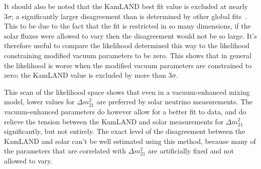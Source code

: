\begin{appendices}
It should also be noted that the KamLAND best fit value is excluded at nearly
$3\sigma$;
a significantly larger disagreement than is determined by other global fits~\cite{nu_fit}.
This to be due to the fact that the fit is restricted in so
many dimensions, if the solar fluxes were allowed to vary then the disagreement
would not be so large.
It's therefore useful to compare the likelihood determined this way to the
likelihood constraining modified vacuum parameters to be zero.
This shows that in general the likelihood is worse when the modified
vacuum parameters are constrained to zero;
the KamLAND value is excluded by more than $3\sigma$.

This scan of the likelihood space shows that even in a vacuum-enhanced mixing
model, lower values for $\Delta m^{2}_{21}$ are preferred by solar neutrino
measurements.
The vacuum-enhanced parameters do however allow for a better fit to data,
and do relieve the tension between the KamLAND and solar measurements for
$\Delta m^{2}_{21}$ significantly, but not entirely.
The exact level of the disagreement between the KamLAND and solar can't
be well estimated using this method, because many of the parameters that
are correlated with $\Delta m^{2}_{21}$ are artificially fixed and not
allowed to vary.

\end{appendices}
